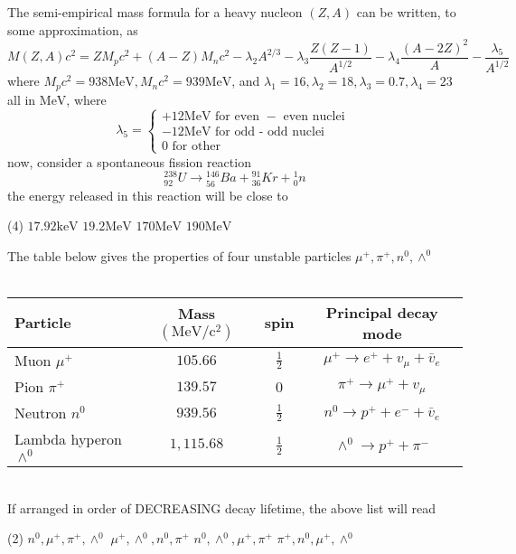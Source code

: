 \begin{questions}
\begin{tasks}
\end{tasks}
\begin{minipage}{\textwidth}
	\question The semi-empirical mass formula for a heavy nucleon $(Z, A)$ can be written, to some approximation, as
	$$
	M(Z, A) c^{2}=Z M_{p} c^{2}+(A-Z) M_{n} c^{2}-\lambda_{2} A^{2 / 3}-\lambda_{3} \frac{Z(Z-1)}{A^{1 / 2}}-\lambda_{4} \frac{(A-2 Z)^{2}}{A}-\frac{\lambda_{5}}{A^{1 / 2}}
	$$
	where $M_{p} c^{2}=938 \mathrm{MeV}, M_{n} c^{2}=939 \mathrm{MeV}$, and $\lambda_{1}=16, \lambda_{2}=18, \lambda_{3}=0.7, \lambda_{4}=23$ all in $\mathrm{MeV}$, where
	$$
	\lambda_{5}=\left\{\begin{array}{c}
	+12 \mathrm{MeV} \text { for even }-\text { even nuclei } \\
	-12 \mathrm{MeV} \text { for odd - odd nuclei } \\
	0 \text { for other }
	\end{array}\right.
	$$
	now, consider a spontaneous fission reaction
	$$
	{ }_{92}^{238} U \rightarrow{ }_{56}^{146} B a+{ }_{36}^{91} K r+{ }_{0}^{1} n
	$$
	the energy released in this reaction will be close to
\end{minipage}
\begin{tasks}(4)
	\task[\textbf{A.}] $17.92 \mathrm{keV}$
	\task[\textbf{B.}]   $19.2 \mathrm{MeV}$
	\task[\textbf{C.}] $170 \mathrm{MeV}$
	\task[\textbf{D.}]   $190 \mathrm{MeV}$
\end{tasks}
\begin{minipage}{\textwidth}
	\question The table below gives the properties of four unstable particles $\mu^{+}, \pi^{+}, n^{0}, \wedge^{0}$\\\\
	\renewcommand*{\arraystretch}{2}
	\begin{tabular}{|lccc|}
		\hline 
		Particle & Mass $\left(\mathrm{MeV} / \mathrm{c}^{2}\right)$ & spin & Principal decay mode \\
		\hline Muon $\mu^{+}$ & $105.66$ & $\frac{1}{2}$ & $\mu^{+} \rightarrow e^{+}+v_{\mu}+\bar{v}_{e}$ \\
		Pion $\pi^{+}$ & $139.57$ & 0 & $\pi^{+} \rightarrow \mu^{+}+v_{\mu}$ \\
		Neutron $n^{0}$ & $939.56$ & $\frac{1}{2}$ & $n^{0} \rightarrow p^{+}+e^{-}+\bar{v}_{e}$ \\
		Lambda hyperon $\wedge^{0}$ & $1,115.68$ & $\frac{1}{2}$ & $\wedge^{0} \rightarrow p^{+}+\pi^{-}$ \\
		\hline
	\end{tabular}\\
	If arranged in order of DECREASING decay lifetime, the above list will read 
\end{minipage}
\begin{tasks}(2)
	\task[\textbf{A.}] $n^{0}, \mu^{+}, \pi^{+}, \wedge^{0}$
	\task[\textbf{B.}] $\mu^{+}, \wedge^{0}, n^{0}, \pi^{+}$
	\task[\textbf{C.}]   $n^{0}, \wedge^{0}, \mu^{+}, \pi^{+}$
	\task[\textbf{D.}] $\pi^{+}, n^{0}, \mu^{+}, \wedge^{0}$
\end{tasks}
\end{questions}